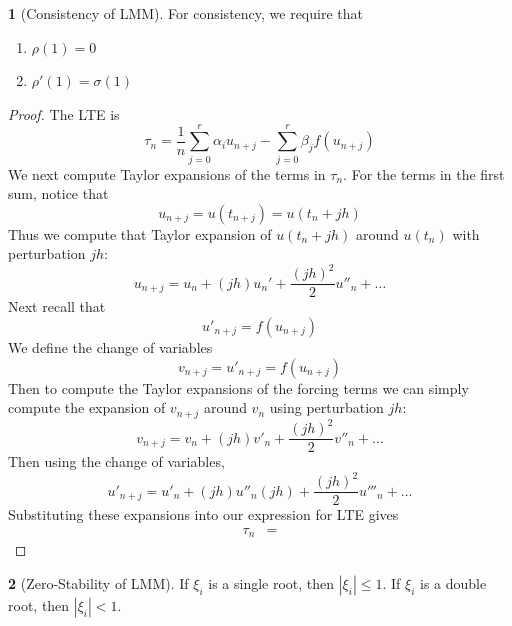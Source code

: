 \documentclass[12pt]{article}
\theoremstyle{definition}
\newtheorem{theorem}{\color{ForestGreen}{\textbf{Theorem}}}
\theoremstyle{definition}
\begin{document}
\begin{theorem}[Consistency of LMM]
For consistency, we require that
\begin{enumerate}
	\item $\rho(1) = 0$
	\item $\rho'(1) = \sigma(1)$
\end{enumerate}
\end{theorem}
\begin{proof}
	The LTE is 
	\begin{equation}
		\tau_n = \frac{1}{n}\sum_{j=0}^r \alpha_i u_{n+j} - \sum_{j=0}^r \beta_j f(u_{n+j})
	\end{equation}
	We next compute Taylor expansions of the terms in $\tau_n$. For the terms in the first sum, notice that
	\begin{equation}
		u_{n+j} = u(t_{n+j}) = u(t_n + jh)
	\end{equation}
	Thus we compute that Taylor expansion of $u(t_n + jh)$ around $u(t_n)$ with perturbation $jh$:
	\begin{equation}
		u_{n+j} = u_n + (jh)u_n' + \frac{(jh)^2}{2}u''_n + \ldots 
	\end{equation}
	Next recall that
	\begin{equation}
		u'_{n+j} = f(u_{n+j})
	\end{equation}
	We define the change of variables
	\begin{equation}
		v_{n+j} = u'_{n+j} = f(u_{n+j})
	\end{equation}
	Then to compute the Taylor expansions of the forcing terms we can simply compute the expansion of $v_{n+j}$ around $v_n$ using perturbation $jh$:
	\begin{equation}
		v_{n+j} = v_n + (jh)v'_n + \frac{(jh)^2}{2}v''_n + \ldots 
	\end{equation}
	Then using the change of variables, 
	\begin{equation}
		u'_{n+j} = u'_n + (jh)u''_n(jh) + \frac{(jh)^2}{2}u'''_n + \ldots
	\end{equation}
	Substituting these expansions into our expression for LTE gives
	\begin{align*}
	\tau_n &= 
	\end{align*}
\end{proof}

\begin{theorem}[Zero-Stability of LMM]
If $\xi_i$ is a single root, then $|\xi_i| \leq 1$. If $\xi_i$ is a double root, then $|\xi_i| < 1$. 
\end{theorem}
\end{document}
